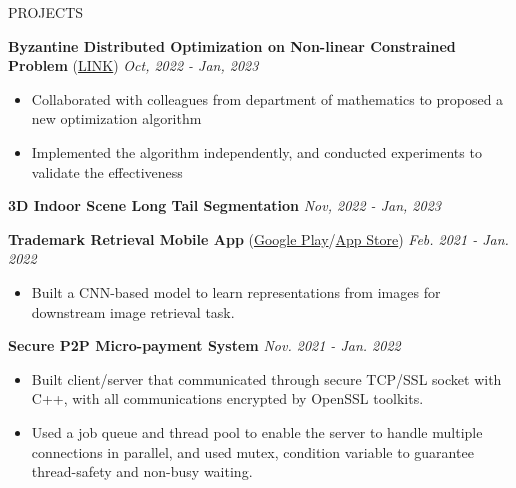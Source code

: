 \documentclass{resume} %
\begin{document}
\begin{rSection}{PROJECTS}
\vspace{-1.25em}

\item {\bf Byzantine Distributed Optimization on Non-linear Constrained Problem} (\href{https://github.com/slimon110/2022_Fault_Tolerance/blob/master/FT-Report/FT-Report.pdf}{LINK})  \hfill \textit{Oct, 2022 - Jan, 2023}
\begin{itemize}
    \itemsep -3pt
    \item Collaborated with colleagues from department of mathematics to proposed a new optimization algorithm
    \item Implemented the algorithm independently, and conducted experiments to validate the effectiveness
\end{itemize}

\item {\bf 3D Indoor Scene Long Tail Segmentation} \hfill \textit{Nov, 2022 -  Jan, 2023}

\item \textbf{Trademark Retrieval Mobile App} (\href{https://play.google.com/store/apps/details?id=meow.logoshot&hl=zh_TW&gl=TW&pli=1}{Google Play}/\href{https://apps.apple.com/tw/app/logo-shot/id1611756574}{App Store}) \hfill \textit{Feb. 2021 - Jan. 2022}
\begin{itemize}
    \itemsep -3pt
    \item  Built a CNN-based model to learn representations from images for downstream image retrieval task.
\end{itemize}

\item \textbf{Secure P2P Micro-payment System} \hfill \textit{Nov. 2021 - Jan. 2022} 
\begin{itemize}
    \itemsep -3pt
    \item Built client/server that communicated through secure TCP/SSL socket with C++, with all communications encrypted by OpenSSL toolkits. 
    \item Used a job queue and thread pool to enable the server to handle multiple connections in parallel, and used mutex, condition variable to guarantee thread-safety and non-busy waiting.
\end{itemize}


\end{rSection}
\end{document}
